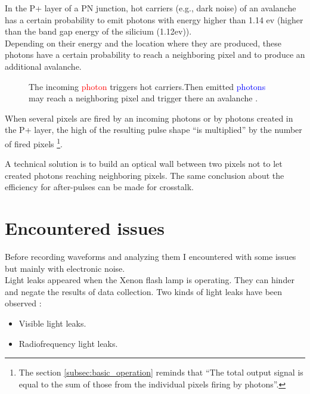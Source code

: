 \documentclass[a4paper, 11pt]{report}%
\newcommand{\xfl}{Xenon flash lamp }
\begin{document}
  In the P+ layer of a PN junction, hot carriers (e.g., dark noise) of an avalanche has a certain probability to emit photons with energy higher than 1.14 ev (higher than 
  the band gap energy of the silicium (1.12ev)).\\
  Depending on their energy and the location where they are produced, these photons have a certain probability to reach a 
  neighboring pixel and to produce an additional avalanche. 
  
  \newpage
  
  \begin{figure}[!hbtp]
  \centering
    \caption{The incoming \textcolor{red}{photon} triggers hot carriers.Then emitted \textcolor{blue}{photons} may reach a 
    neighboring pixel and trigger there an avalanche \cite{ref:motivation_and_introduction}.}
    \label{fig:CT}
  \end{figure}
  
  When several pixels are fired  by an incoming photons or by photons created in the P+ layer, the high of the resulting pulse shape 
  ``is multiplied'' by the number of fired pixels \footnote{The section \ref{subsec:basic_operation} reminds that ``The total output signal is equal to the sum of those from the individual 
  pixels firing by photons''.}. 
  
  A technical solution is to build an optical wall between two pixels not to let created photons reaching neighboring pixels. The same conclusion about the efficiency for after-pulses can 
  be made for crosstalk.
  \\
  
    
  \section{Encountered issues}  
  
  Before recording waveforms and analyzing them I encountered with some issues but mainly with electronic noise.\\
  Light leaks appeared when the \xfl is operating. They can hinder and negate the results of data collection. 
  Two kinds of light leaks have been observed :
  
  \begin{itemize}
   \item Visible light leaks.
   \item Radiofrequency light leaks.   
  \end{itemize}
  
\end{document}

